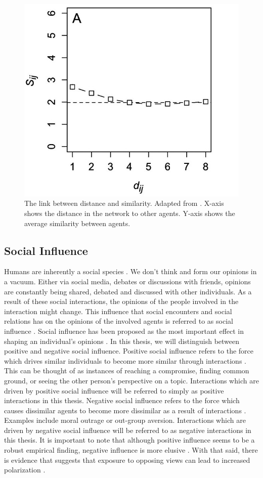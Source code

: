 \documentclass[11pt]{article}
\begin{document}
\begin{figure}[H]
    \centering
    \includegraphics[width=.5\linewidth]{../plots/references/kossinets_watts_distance.jpeg}
  \caption{The link between distance and similarity. Adapted from \protect\citeauthor{kossinets_origins_2009} \protect\citeyear{kossinets_origins_2009}. X-axis shows the distance in the network to other agents. Y-axis shows the average similarity between agents.}
  \label{fig:distance_similarity}
\end{figure}

\subsection{Social Influence}
Humans are inherently a social species \cite{kurzban2015evolution}. We don't think and form our opinions in a vacuum. Either via social media, debates or discussions with friends, opinions are constantly being shared, debated and discussed with other individuals. 
As a result of these social interactions, the opinions of the people involved in the interaction might change. 
This influence that social encounters and social relations has on the opinions of the involved agents is referred to as social influence \cite{friedkin_social_1990}. Social influence has been proposed as the most important effect in shaping an individual’s opinions \cite{chacoma_opinion_2015, flache_between_2018}. 
In this thesis, we will distinguish between positive and negative social influence. Positive social influence refers to the force which drives similar individuals to become more similar through interactions \cite{flache_models_2017,levin_dynamics_2021}. 
This can be thought of as instances of reaching a compromise, finding common ground, or seeing the other person’s perspective on a topic. Interactions which are driven by positive social influence will be referred to simply as positive interactions in this thesis. Negative social influence refers to the force which causes dissimilar agents to become more dissimilar as a result of interactions \cite{flache_models_2017}. 
Examples include moral outrage or out-group aversion. Interactions which are driven by negative social influence will be referred to as negative interactions in this thesis. It is important to note that although positive influence seems to be a robust empirical finding, negative influence is more elusive \cite{flache_models_2017,takacs_is_2014,turner_paths_2018}. 
With that said, there is evidence that suggests that exposure to opposing views can lead to increased polarization \cite{bail_exposure_2018}.
\end{document}
